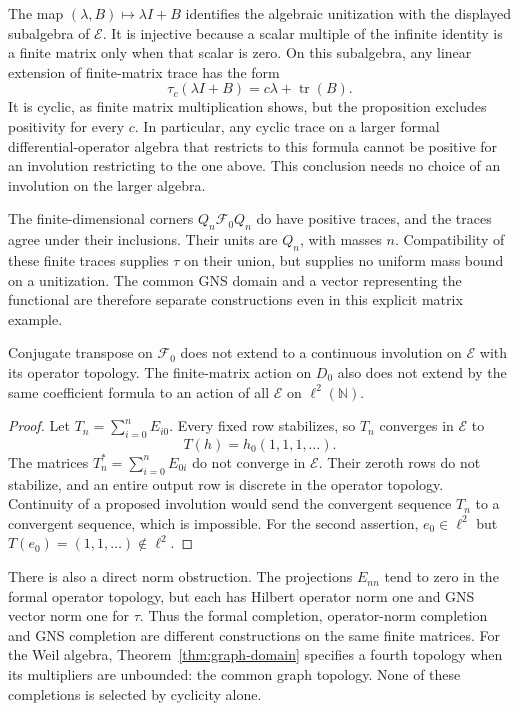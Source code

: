 The map $(\lambda,B)\mapsto\lambda I+B$ identifies the algebraic
unitization with the displayed subalgebra of $\mathscr E$.
It is injective because a scalar multiple of the infinite identity is
a finite matrix only when that scalar is zero.
On this subalgebra, any linear extension of finite-matrix trace has the
form
\[
 \tau_c(\lambda I+B)=c\lambda+\operatorname{tr}(B).
\]
It is cyclic, as finite matrix multiplication shows, but the proposition
excludes positivity for every $c$.  In particular, any cyclic trace on
a larger formal differential-operator algebra that restricts to this
formula cannot be positive for an involution restricting to the one above.
This conclusion needs no choice of an involution on the larger algebra.

The finite-dimensional corners $Q_n\mathscr F_0Q_n$ do have positive
traces, and the traces agree under their inclusions.  Their units are
$Q_n$, with masses $n$.  Compatibility of these finite traces supplies
$\tau$ on their union, but supplies no uniform mass bound on a unitization.
The common GNS domain and a vector representing the functional are
therefore separate constructions even in this explicit matrix example.

\begin{proposition}
\label{prop:weil-formal-adjoint}
Conjugate transpose on $\mathscr F_0$ does not extend to a continuous
involution on $\mathscr E$ with its operator topology.
The finite-matrix action on $D_0$ also does not extend by the same
coefficient formula to an action of all $\mathscr E$ on
$\ell^2(\mathbb N)$.
\end{proposition}
\begin{proof}
Let $T_n=\sum_{i=0}^nE_{i0}$.
Every fixed row stabilizes, so $T_n$ converges in $\mathscr E$ to
\[
 T(h)=h_0(1,1,1,\ldots).
\]
The matrices $T_n^*=\sum_{i=0}^nE_{0i}$ do not converge in
$\mathscr E$.  Their zeroth rows do not stabilize, and an entire output
row is discrete in the operator topology.  Continuity of a proposed
involution would send the convergent sequence $T_n$ to a convergent
sequence, which is impossible.
For the second assertion, $e_0\in\ell^2$ but
$T(e_0)=(1,1,\ldots)\notin\ell^2$.
\end{proof}

There is also a direct norm obstruction.
The projections $E_{nn}$ tend to zero in the formal operator topology,
but each has Hilbert operator norm one and GNS vector norm one for
$\tau$.  Thus the formal completion, operator-norm completion and
GNS completion are different constructions on the same finite matrices.
For the Weil algebra, Theorem~\ref{thm:graph-domain} specifies a fourth
topology when its multipliers are unbounded: the common graph topology.
None of these completions is selected by cyclicity alone.

